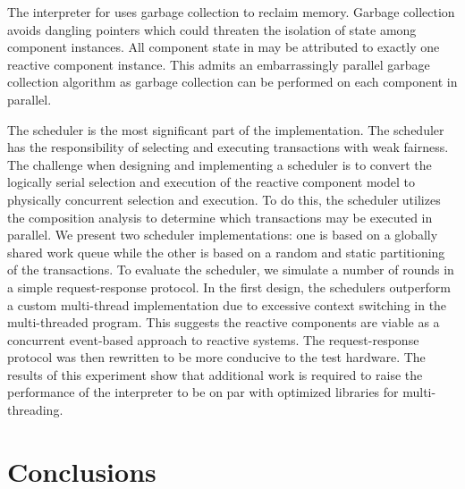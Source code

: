 The interpreter for \rcgo{} uses garbage collection to reclaim memory.
Garbage collection avoids dangling pointers which could threaten the isolation of state among component instances.
All component state in \rcgo{} may be attributed to exactly one reactive component instance.
This admits an embarrassingly parallel garbage collection algorithm as garbage collection can be performed on each component in parallel.

The scheduler is the most significant part of the \rcgo{} implementation.
The scheduler has the responsibility of selecting and executing transactions with weak fairness.
The challenge when designing and implementing a scheduler is to convert the logically serial selection and execution of the reactive component model to physically concurrent selection and execution.
To do this, the scheduler utilizes the composition analysis to determine which transactions may be executed in parallel.
We present two scheduler implementations:  one is based on a globally shared work queue while the other is based on a random and static partitioning of the transactions.
To evaluate the scheduler, we simulate a number of rounds in a simple request-response protocol.
In the first design, the \rcgo{} schedulers outperform a custom multi-thread implementation due to excessive context switching in the multi-threaded program.
This suggests the reactive components are viable as a concurrent event-based approach to reactive systems.
The request-response protocol was then rewritten to be more conducive to the test hardware.
The results of this experiment show that additional work is required to raise the performance of the \rcgo{} interpreter to be on par with optimized libraries for multi-threading.

\section{Conclusions}

